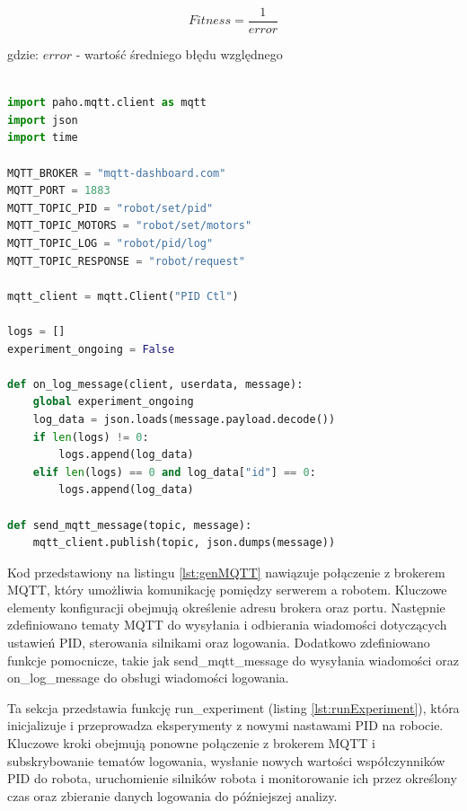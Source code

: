 \documentclass[12pt,twoside]{article}
\begin{document}
\begin{equation}
Fitness = \frac{1}{error}
\label{Eq:fitness}
\end{equation}

gdzie: $error$ - wartość średniego błędu względnego \\ \\

\newpage

\begin{lstlisting}[language=Python, caption=Konfiguracja MQTT, label={lst:genMQTT}]
import paho.mqtt.client as mqtt
import json
import time

MQTT_BROKER = "mqtt-dashboard.com"
MQTT_PORT = 1883
MQTT_TOPIC_PID = "robot/set/pid"
MQTT_TOPIC_MOTORS = "robot/set/motors"
MQTT_TOPIC_LOG = "robot/pid/log"
MQTT_TOPIC_RESPONSE = "robot/request"

mqtt_client = mqtt.Client("PID Ctl")

logs = []
experiment_ongoing = False

def on_log_message(client, userdata, message):
    global experiment_ongoing
    log_data = json.loads(message.payload.decode())
    if len(logs) != 0: 
        logs.append(log_data) 
    elif len(logs) == 0 and log_data["id"] == 0:
        logs.append(log_data)

def send_mqtt_message(topic, message):
    mqtt_client.publish(topic, json.dumps(message))
\end{lstlisting}

Kod przedstawiony na listingu \ref{lst:genMQTT} nawiązuje połączenie z brokerem MQTT, który umożliwia komunikację pomiędzy serwerem a robotem. Kluczowe elementy konfiguracji obejmują określenie adresu brokera oraz portu. Następnie zdefiniowano tematy MQTT do wysyłania i odbierania wiadomości dotyczących ustawień PID, sterowania silnikami oraz logowania. Dodatkowo zdefiniowano funkcje pomocnicze, takie jak send\_mqtt\_message do wysyłania wiadomości oraz on\_log\_message do obsługi wiadomości logowania.

Ta sekcja przedstawia funkcję run\_experiment (listing \ref{lst:runExperiment}), która inicjalizuje i przeprowadza eksperymenty z nowymi nastawami PID na robocie. Kluczowe kroki obejmują ponowne połączenie z brokerem MQTT i subskrybowanie tematów logowania, wysłanie nowych wartości współczynników PID do robota, uruchomienie silników robota i monitorowanie ich przez określony czas oraz zbieranie danych logowania do późniejszej analizy.
\end{document}
